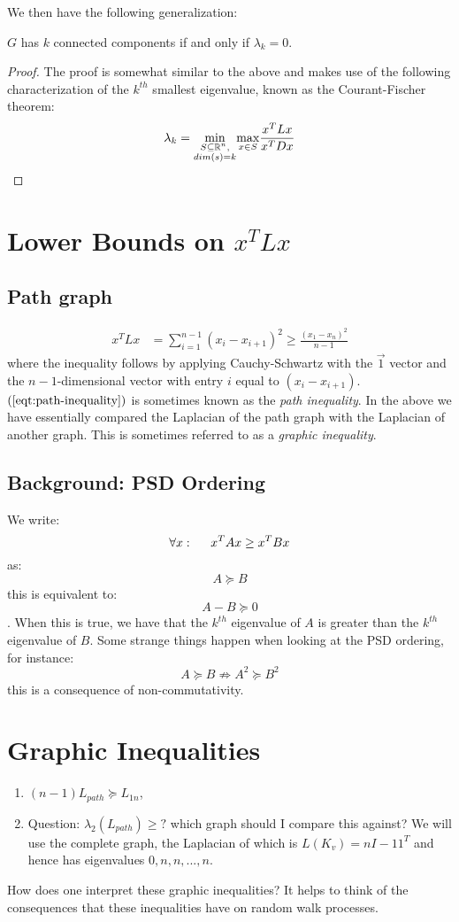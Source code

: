 \documentclass[11pt]{article}
\begin{document}
    We then have the following generalization:
    \begin{proposition}
    $G$ has $k$ connected components if and only if $\lambda_k = 0$.
    \end{proposition}
    \begin{proof}
        The proof is somewhat similar to the above and makes use of the following characterization of the $k^{th}$ smallest eigenvalue, known as the Courant-Fischer theorem:
        \[
            \lambda_k = \underset{\substack{S \subseteq \mathbb{R}^n,\\ dim(s) = k}}{\min} \underset{x \in S}{\max} \frac{x^TLx}{x^TDx}
        \]
    \end{proof}
    \section*{Lower Bounds on $x^TLx$}
    \subsection*{Path graph}
    \begin{align}\label{eqt:path-inequality}
        x^TLx &= \sum_{i=1}^{n-1} (x_i - x_{i+1})^2 \geq \frac{(x_1 - x_n)^2}{n-1}
    \end{align}
    where the inequality follows by applying Cauchy-Schwartz with the $\vec{1}$ vector and the $n-1$-dimensional vector with entry $i$ equal to $(x_i-x_{i+1})$. $(\ref{eqt:path-inequality})$ is sometimes known as the \emph{path inequality}. In the above we have essentially compared the Laplacian of the path graph with the Laplacian of another graph. This is sometimes referred to as a \emph{graphic inequality}.
    
    \subsection*{Background: PSD Ordering}
    We write:
    \[
        \forall x: \hspace{0.5cm} x^TAx \geq x^TBx
    \]
    as:
    \[
        A \succeq B
    \]
    this is equivalent to:
    \[
        A- B \succeq 0
    \].
    When this is true, we have that the $k^{th}$ eigenvalue of $A$ is greater than the $k^{th}$ eigenvalue of $B$. Some strange things happen when looking at the PSD ordering, for instance:
    \[
        A \succeq B \not\Rightarrow A^2 \succeq B^2
    \]
    this is a consequence of non-commutativity.
    \section*{Graphic Inequalities}
    \begin{enumerate}
        \item $(n-1)L_{path} \succeq L_{1n}$,
        \item Question: $\lambda_2(L_{path}) \geq ?$ which graph should I compare this against? We will use the complete graph, the Laplacian of which is $L(K_v) = nI - 11^T$ and hence has eigenvalues $0, n, n, ..., n$.
        
    \end{enumerate}
    How does one interpret these graphic inequalities? It helps to think of the consequences that these inequalities have on random walk processes.
\end{document}
